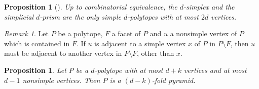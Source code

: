 \documentclass[a4paper]{amsart}
\newtheorem{proposition}[theorem]{Proposition}
\theoremstyle{definition}
\theoremstyle{remark}
\newtheorem{remark}[theorem]{Remark}
\begin{document}
\begin{proposition}[{\cite[Lem.~10(ii)-(iii)]{PrzYos16}}]\label{prop:simplePolytopes}  Up to combinatorial equivalence, the $d$-simplex and the simplicial $d$-prism are the only  simple $d$-polytopes with at most $2d$ vertices. 
\end{proposition}

\begin{remark}\label{rmk:simpleVertexOutside}
Let $P$ be a polytope, $F$ a facet of $P$ and $u$ a nonsimple vertex of $P$ which is contained in $F$. If $u$ is adjacent to a simple vertex $x$ of $P$ in $P\setminus F$, then $u$ must be adjacent to another vertex in $P\setminus F$, other than $x$.
\end{remark}

\begin{proposition}\label{prop:d+k} Let $P$ be a $d$-polytope with at most $d+k$ vertices and at most $d-1$ nonsimple vertices. Then $P$ is a $(d-k)$-fold pyramid.
\end{proposition}
\end{document}
